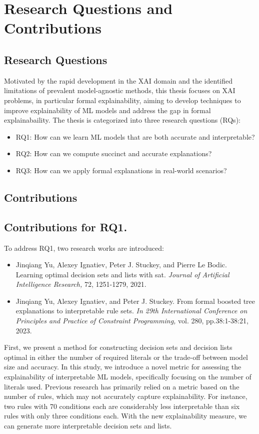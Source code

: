 \section{Research Questions and Contributions}

\subsection{Research Questions}
Motivated by the rapid development in the XAI domain
and the identified limitations of prevalent model-agnostic methods,
this thesis focuses on XAI problems, in particular formal explainability, 
aiming to develop techniques to improve explainability of ML models 
and address the gap in formal explainabaility.
%
The thesis is categorized into three research questions (RQs):
\begin{itemize}
	\item RQ1: How can we learn ML models that are both accurate and interpretable?
	\item RQ2: How can we compute succinct and accurate explanations?
	\item RQ3: How can we apply formal explanations in real-world scenarios? 
\end{itemize}

\subsection{Contributions}

\subsection{Contributions for RQ1.}

To address RQ1, two research works are introduced:

\begin{itemize}
	\item Jinqiang Yu, Alexey Ignatiev, Peter J. Stuckey, and Pierre Le Bodic. Learning optimal decision
sets and lists with sat. \emph{Journal of Artificial Intelligence Research,} 72, 1251-1279, 2021.

	\item Jinqiang Yu, Alexey Ignatiev, and Peter J. Stuckey. From formal boosted tree explanations to
interpretable rule sets. \emph{In 29th International Conference on Principles and Practice of
	Constraint Programming,} vol. 280, pp.38:1-38:21, 2023.
\end{itemize}

First, we present a method for constructing decision sets and decision lists optimal in
either the number of required literals or the trade-off between model size and accuracy.
%
In this study, we introduce a novel metric for assessing the explainability of 
interpretable ML models, specifically focusing on the number of literals used.
%
Previous research has primarily relied on a metric based on the number of rules, 
which may not accurately capture explainability.
%
For instance, two rules with 70 conditions each are considerably
less interpretable than six rules with only three conditions each.
%
With the new explainability measure, we can generate more interpretable decision sets and lists.

